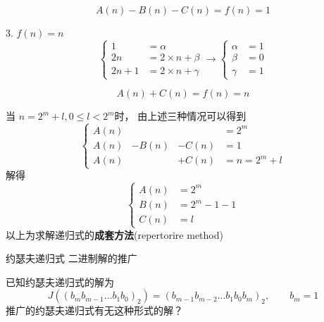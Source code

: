 \documentclass[mode=geye]{elegantnote}
\begin{document}
\begin{equation*}
	A(n)-B(n)-C(n) = f(n) = 1
\end{equation*}

3. $ f(n) = n $
\begin{equation*}
	\left\{
	\begin{aligned}
		1    &= \alpha             \\
		2n   &= 2\times n + \beta  \\
		2n+1 &= 2\times n + \gamma 
	\end{aligned}	
	\right.
	\rightarrow
	\left\{
	\begin{aligned}
		\alpha &= 1  \\
		\beta  &= 0  \\ 
		\gamma &= 1
	\end{aligned}
	\right.	
\end{equation*}

\begin{equation*}
	A(n) + C(n) = f(n) = n
\end{equation*}

当 $ n = 2^m+l, 0\leqslant l< 2^m $时，
由上述三种情况可以得到
\begin{equation*}
	\left\{
	\begin{aligned}
		A(n) &       &          &= 2^m        \\
		A(n) &- B(n) &-  C(n)   &= 1          \\
		A(n) &       &+  C(n)   &= n = 2^m+l
	\end{aligned}
	\right.
\end{equation*}
解得
\begin{equation*}
	\left\{
	\begin{aligned}
		A(n) &= 2^m        \\
		B(n) &= 2^m-1-1    \\
		C(n) &= l
	\end{aligned}
	\right.
\end{equation*}
以上为求解递归式的\textbf{成套方法}(repertorire method)

\begin{remark}
	约瑟夫递归式 二进制解的推广
\end{remark}
已知约瑟夫递归式的解为
\begin{equation*}
	J((b_m b_{m-1}\dots b_1 b_0)_2) = (b_{m-1} b_{m-2}\dots b_1 b_0 b_m)_2, \qquad b_m = 1
\end{equation*}
推广的约瑟夫递归式有无这种形式的解？
\end{document}
